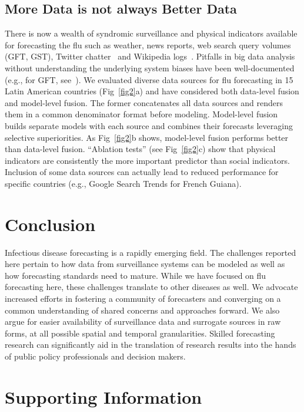 \documentclass[10pt,letterpaper]{article}
\begin{document}
\subsection*{More Data is not always Better Data}
There is now a wealth of syndromic surveillance and physical indicators
available for forecasting the flu such as weather, news reports, web search
query volumes (GFT, GST), Twitter chatter~\cite{chakraborty2014forecasting} and
Wikipedia logs~\cite{mciver2014wikipedia,hickman2015wikipedia}.  Pitfalls in
big data analysis without understanding the underlying system biases have been
well-documented (e.g., for GFT, see~\cite{lazer2014parable}).  We evaluated
diverse data sources for flu forecasting in 15 Latin American countries
(Fig~\ref{fig2}a) and have considered both data-level fusion and model-level
fusion. The former concatenates all data sources and renders them in a common
denominator format before modeling. Model-level fusion builds separate models
with each source and combines their forecasts leveraging selective
superiorities. As Fig~\ref{fig2}b shows, model-level fusion performs better
than data-level fusion. “Ablation tests” (see Fig~\ref{fig2}c) show that
physical indicators are consistently the more important predictor than social
indicators. Inclusion of some data sources can actually lead to reduced
performance for specific countries (e.g., Google Search Trends for French
Guiana).

\section*{Conclusion}
Infectious disease forecasting is a rapidly emerging field. The challenges
reported here pertain to how data from surveillance systems can be modeled as
well as how forecasting standards need to mature. While we have focused on flu
forecasting here, these challenges translate to other diseases as well. We
advocate increased efforts in fostering a community of forecasters and
converging on a common understanding of shared concerns and approaches forward.
We also argue for easier availability of surveillance data and surrogate
sources in raw forms, at all possible spatial and temporal granularities.
Skilled forecasting research can significantly aid in the translation of
research results into the hands of public policy professionals and decision
makers.

\section*{Supporting Information}
\end{document}
